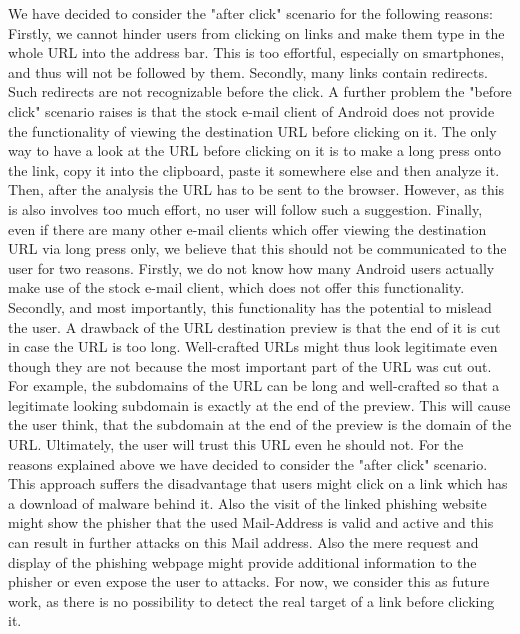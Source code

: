 \begin{description}[leftmargin=0cm]
	\item["After Click" URL Analysis] We have decided to consider the "after click" scenario for the following reasons: Firstly, we cannot hinder users from clicking on links and make them type in the whole URL into the address bar.
 This is too effortful, especially on smartphones, and thus will not be followed by them.
 Secondly, many links contain redirects.
 Such redirects are not recognizable before the click.
 A further problem the "before click" scenario raises is that the stock e-mail client of Android does not provide the functionality of viewing the destination URL before clicking on it.
 The only way to have a look at the URL before clicking on it is to make a long press onto the link, copy it into the clipboard, paste it somewhere else and then analyze it.
 Then, after the analysis the URL has to be sent to the browser.
 However, as this is also involves too much effort, no user will follow such a suggestion.
 Finally, even if there are many other e-mail clients which offer viewing the destination URL via long press only, we believe that this should not be communicated to the user for two reasons.
 Firstly, we do not know how many Android users actually make use of the stock e-mail client, which does not offer this functionality.
 Secondly, and most importantly, this functionality has the potential to mislead the user.
 A drawback of the URL destination preview is that the end of it is cut in case the URL is too long.
 Well-crafted URLs might thus look legitimate even though they are not because the most important part of the URL was cut out.
 For example, the subdomains of the URL can be long and well-crafted so that a legitimate looking subdomain is exactly at the end of the preview.
 This will cause the user think, that the subdomain at the end of the preview is the domain of the URL.
 Ultimately, the user will trust this URL even he should not.
 For the reasons explained above we have decided to consider the "after click" scenario.
 This approach suffers the disadvantage that users might click on a link which has a download of malware behind it.
 Also the visit of the linked phishing website might show the phisher that the used Mail-Address is valid and active and this can result in further attacks on this Mail address. Also the mere request and display of the phishing webpage might provide additional information to the phisher or even expose the user to attacks.
  For now, we consider this as future work, as there is no possibility to detect the real target of a link before clicking it.


\end{description}
